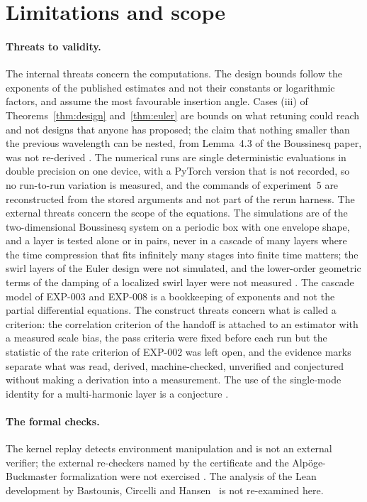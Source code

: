 \documentclass[11pt]{article}
\theoremstyle{remark}
\newcommand{\ev}[1]{\hspace{0.2em}{\small\textsf{[#1]}}}
\begin{document}
\section{Limitations and scope}\label{sec:scope}

\paragraph{Threats to validity.} The internal threats concern the computations. The design bounds follow the exponents of the
published estimates and not their constants or logarithmic factors, and assume the most favourable insertion angle. Cases
(iii) of Theorems~\ref{thm:design} and~\ref{thm:euler} are bounds on what retuning could reach and not designs that anyone
has proposed; the claim that nothing smaller than the previous wavelength can be nested, from Lemma~4.3 of the Boussinesq
paper, was not re-derived \ev{U}. The numerical runs are single deterministic evaluations in double precision on one
device, with a PyTorch version that is not recorded, so no run-to-run variation is measured, and the commands of experiment~5
are reconstructed from the stored arguments and not part of the rerun harness. The external threats concern the scope of the
equations. The simulations are of the two-dimensional Boussinesq system on a periodic box with one envelope shape, and a
layer is tested alone or in pairs, never in a cascade of many layers where the time compression that fits infinitely many
stages into finite time matters; the swirl layers of the Euler design were not simulated, and the lower-order geometric terms of
the damping of a localized swirl layer were not measured \ev{U}. The cascade model of EXP-003 and EXP-008 is a bookkeeping of
exponents and not the partial differential equations. The construct threats concern what is called a criterion: the
correlation criterion of the handoff is attached to an estimator with a measured scale bias, the pass criteria were fixed
before each run but the statistic of the rate criterion of EXP-002 was left open, and the evidence marks separate what was
read, derived, machine-checked, unverified and conjectured without making a derivation into a measurement. The use of the
single-mode identity for a multi-harmonic layer is a conjecture \ev{C}.

\paragraph{The formal checks.} The kernel replay detects environment manipulation and is not an external verifier; the
external re-checkers named by the certificate and the Alp\"oge-Buckmaster formalization were not exercised \ev{U}. The
analysis of the Lean development by Bastounis, Circelli and Hansen~\cite{bch} is not re-examined here.
\end{document}
